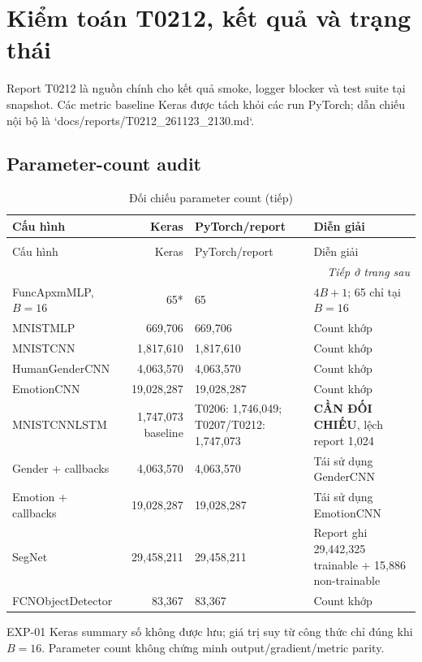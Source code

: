\chapter{Kiểm toán T0212, kết quả và trạng thái}\label{ch:evidence}
Report T0212 là nguồn chính cho kết quả smoke, logger blocker và test suite tại snapshot. Các metric baseline Keras được tách khỏi các run PyTorch; dẫn chiếu nội bộ là `docs/reports/T0212_261123_2130.md`.

\section{Parameter-count audit}
\begin{longtable}{p{}r p{}p{}}
\caption{Đối chiếu parameter count theo baseline/task reports}\label{tab:t0402-params}\\
\toprule Cấu hình & Keras & PyTorch/report & Diễn giải \\
\midrule
\endfirsthead
\caption[]{Đối chiếu parameter count (tiếp)}\\\toprule Cấu hình & Keras & PyTorch/report & Diễn giải \\
\midrule
\endhead
\midrule\multicolumn{4}{r}{\footnotesize\itshape Tiếp ở trang sau}\\
\endfoot
\bottomrule
\endlastfoot
FuncApxmMLP, $B=16$ & 65* & 65 & $4B+1$; 65 chỉ tại $B=16$ \\
MNISTMLP & 669,706 & 669,706 & Count khớp \\
MNISTCNN & 1,817,610 & 1,817,610 & Count khớp \\
HumanGenderCNN & 4,063,570 & 4,063,570 & Count khớp \\
EmotionCNN & 19,028,287 & 19,028,287 & Count khớp \\
MNISTCNNLSTM & 1,747,073 baseline & T0206: 1,746,049; T0207/T0212: 1,747,073 & \textbf{CẦN ĐỐI CHIẾU}, lệch report 1,024 \\
Gender + callbacks & 4,063,570 & 4,063,570 & Tái sử dụng GenderCNN \\
Emotion + callbacks & 19,028,287 & 19,028,287 & Tái sử dụng EmotionCNN \\
SegNet & 29,458,211 & 29,458,211 & Report ghi 29,442,325 trainable + 15,886 non-trainable \\
FCNObjectDetector & 83,367 & 83,367 & Count khớp \\
\end{longtable}
\noindent * EXP-01 Keras summary số không được lưu; giá trị suy từ công thức chỉ đúng khi $B=16$. Parameter count không chứng minh output/gradient/metric parity.

